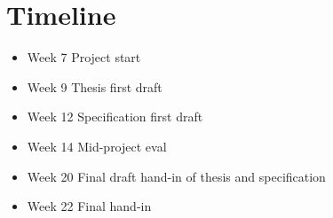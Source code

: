 \documentclass[journal]{IEEEtran}
\begin{document}
\section{Timeline}
\begin{itemize}
    \item Week 7 Project start
    \item Week 9 Thesis first draft
    \item Week 12 Specification first draft
    \item Week 14 Mid-project eval
    \item Week 20 Final draft hand-in of thesis and specification
    \item Week 22 Final hand-in
\end{itemize}


\printbibliography{}

\end{document}
